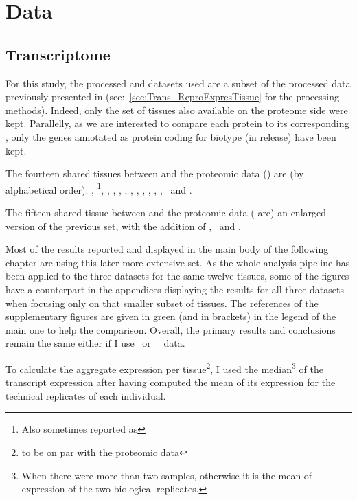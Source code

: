 \begin{comment}
(1) Etat des lieux méthode 1
(2) En travaillant sur l'integration·
(3) Etat des lieux méthode 2
\end{comment}

\section{Data}\label{sec:IntegrationData}

\subsection{Transcriptome}
For this study, the processed  and  datasets
used are a subset of the processed data previously presented in
 (see:~\cref{sec:Trans_ReproExpresTissue}
for the processing methods). Indeed, only the set of tissues also available
on the proteome side were kept. Parallelly, as we are interested to compare each
protein to its corresponding \mRNA, only the genes annotated as protein coding
for biotype (in  release) have been kept.

The fourteen shared tissues between  and the proteomic data
() are
(by alphabetical order): \adrenal, \Bladder{}\footnote{Also
sometimes reported as },
\hColon, \fcortex, \Oesophagus, \Heart,
\Kidney, \Liver, \Lung, \Ovary, \Pancreas,
\Prostate, \Spinal\ and \Testis.

The fifteen shared tissue between  and the proteomic data
( are)
an enlarged version of the previous set, with the addition of \Gall,
\Placenta\ and \Rectum.

Most of the results reported and displayed in the main body
of the following chapter are using this later more extensive set.
As the whole analysis
pipeline has been applied to the three datasets
for the same twelve tissues, some of the figures have a counterpart in the
appendices displaying the results for all three datasets when focusing only on
that smaller subset of tissues.
The references of the supplementary figures are given in green (and in brackets)
in the legend of the main one to help the comparison.
Overall, the primary results and conclusions remain the same either if
I use \gtex\ or \uhlen\ \etal\ data.

To calculate the aggregate expression per tissue\footnote{to be on par with the
proteomic data}, I used the median\footnote{When there were more than
two samples, otherwise it is the mean of expression of the two biological
replicates.} of the transcript expression after having computed the mean of its
expression for the technical replicates of each individual.


